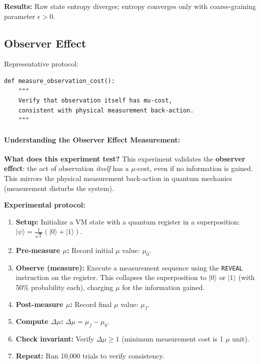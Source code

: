 \textbf{Results:} Raw state entropy diverges; entropy converges only with coarse-graining parameter $\epsilon > 0$.

\subsection{Observer Effect}

Representative protocol:
\begin{lstlisting}
def measure_observation_cost():
    """
    Verify that observation itself has mu-cost,
    consistent with physical measurement back-action.
    """
\end{lstlisting}

\paragraph{Understanding the Observer Effect Measurement:}

\textbf{What does this experiment test?} This experiment validates the \textbf{observer effect}: the act of observation \textit{itself} has a $\mu$-cost, even if no information is gained. This mirrors the physical measurement back-action in quantum mechanics (measurement disturbs the system).

\textbf{Experimental protocol:}
\begin{enumerate}
    \item \textbf{Setup:} Initialize a VM state with a quantum register in a superposition: $|\psi\rangle = \frac{1}{\sqrt{2}}(|0\rangle + |1\rangle)$.
    
    \item \textbf{Pre-measure $\mu$:} Record initial $\mu$ value: $\mu_0$.
    
    \item \textbf{Observe (measure):} Execute a measurement sequence using the \texttt{REVEAL} instruction on the register. This collapses the superposition to $|0\rangle$ or $|1\rangle$ (with 50\% probability each), charging $\mu$ for the information gained.
    
    \item \textbf{Post-measure $\mu$:} Record final $\mu$ value: $\mu_f$.
    
    \item \textbf{Compute $\Delta\mu$:} $\Delta\mu = \mu_f - \mu_0$.
    
    \item \textbf{Check invariant:} Verify $\Delta\mu \geq 1$ (minimum measurement cost is 1 $\mu$ unit).
    
    \item \textbf{Repeat:} Run 10,000 trials to verify consistency.
\end{enumerate}

